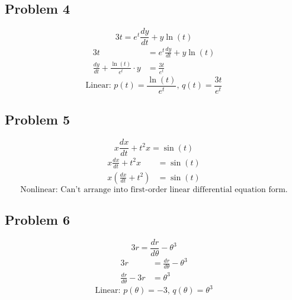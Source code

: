 \documentclass{article}
\begin{document}
\subsection{Problem 4}
$$ 3t = e^t\frac{dy}{dt} + y\ln(t) $$
\begin{align*}
    3t & = e^t\frac{dy}{dt} + y\ln(t) \\
    \frac{dy}{dt} + \frac{\ln(t)}{e^t} \cdot y & = \frac{3t}{e^t}
\end{align*}
\begin{equation*}
    \boxed{
        \text{Linear: } p(t) = \frac{\ln(t)}{e^t} \text{, } q(t) = \frac{3t}{e^t}
    }
\end{equation*}

\subsection{Problem 5}
$$ x\frac{dx}{dt} + t^2x = \sin(t) $$
\begin{align*}
    x\frac{dx}{dt} + t^2x & = \sin(t) \\
    x\left(\frac{dx}{dt} + t^2\right) & = \sin(t)
\end{align*}
\begin{equation*}
    \boxed{
        \text{Nonlinear: Can't arrange into first-order linear differential equation form.}
    }
\end{equation*}

\subsection{Problem 6}
$$ 3r = \frac{dr}{d\theta} - \theta^3 $$
\begin{align*}
    3r & = \frac{dr}{d\theta} - \theta^3 \\
    \frac{dr}{d\theta} - 3r & = \theta^3
\end{align*}
\begin{equation*}
    \boxed{
        \text{Linear: } p(\theta) = -3 \text{, } q(\theta) = \theta^3
    }
\end{equation*}
\end{document}
